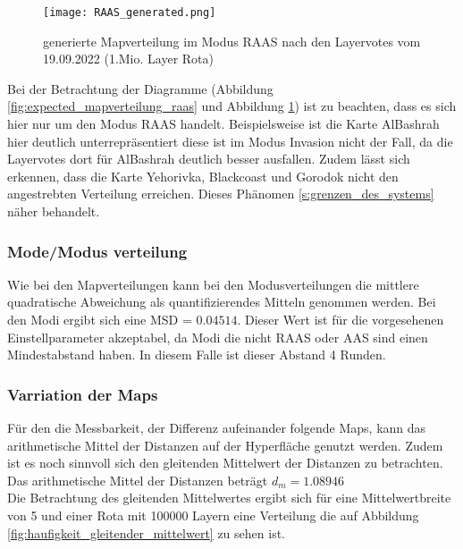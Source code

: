             \begin{figure}[htbp]
                \centering
                \texttt{[image: RAAS\_generated.png]}
                \caption{generierte Mapverteilung im Modus RAAS nach den Layervotes vom 19.09.2022 (1.Mio. Layer Rota)}
                \label{fig:generated_mapverteilung_raas}
            \end{figure}

            Bei der Betrachtung der Diagramme 
            (Abbildung \ref{fig:expected_mapverteilung_raas} und Abbildung \ref{fig:generated_mapverteilung_raas}) 
            ist zu beachten, dass es sich hier nur um den Modus RAAS handelt.
            Beispielsweise ist die Karte AlBashrah hier deutlich unterrepräsentiert diese ist im Modus Invasion
            nicht der Fall, da die Layervotes dort für AlBashrah deutlich besser ausfallen.
            Zudem lässt sich erkennen, dass die Karte Yehorivka, Blackcoast und Gorodok nicht den angestrebten
            Verteilung erreichen. Dieses Phänomen \ref{s:grenzen_des_systems} näher behandelt.

        \subsubsection{Mode/Modus verteilung}
            Wie bei den Mapverteilungen kann bei den Modusverteilungen die mittlere quadratische Abweichung als
            quantifizierendes Mitteln genommen werden. Bei den Modi ergibt sich eine MSD = $0.04514$.
            Dieser Wert ist für die vorgesehenen Einstellparameter akzeptabel, da Modi die nicht RAAS oder AAS sind
            einen Mindestabstand haben. In diesem Falle ist dieser Abstand 4 Runden.
        \subsubsection{Varriation der Maps}
            Für den die Messbarkeit, der Differenz aufeinander folgende Maps, kann das arithmetische Mittel der Distanzen
            auf der Hyperfläche genutzt werden. Zudem ist es noch sinnvoll sich den gleitenden Mittelwert der Distanzen
            zu betrachten.\\
            Das arithmetische Mittel der Distanzen beträgt $d_m = 1.08946$\\
            Die Betrachtung des gleitenden Mittelwertes ergibt sich für eine Mittelwertbreite von 5 und einer Rota mit 100000 Layern
            eine Verteilung die auf Abbildung \ref{fig:haufigkeit_gleitender_mittelwert} zu sehen ist.
            
